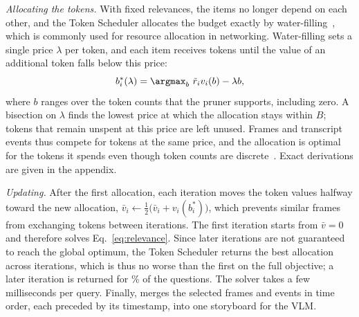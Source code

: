 \textit{Allocating the tokens.} With fixed relevances, the items no longer depend on each other, and the Token Scheduler allocates the budget exactly by water-filling~\cite{boyd2004}, which is commonly used for resource allocation in networking. Water-filling sets a single price $\lambda$ per token, and each item receives tokens until the value of an additional token falls below this price:
\begin{equation}
  b_i^*(\lambda)=\argmax_{b}\ \tilde r_iv_i(b)-\lambda b ,
  \label{eq:percost}
\end{equation}
where $b$ ranges over the token counts that the pruner supports, including zero. A bisection on $\lambda$ finds the lowest price at which the allocation stays within $B$; tokens that remain unspent at this price are left unused. Frames and transcript events thus compete for tokens at the same price, and the allocation is optimal for the tokens it spends even though token counts are discrete~\cite{everett1963}. Exact derivations are given in the appendix.

\textit{Updating.} After the first allocation, each iteration moves the token values halfway toward the new allocation, $\bar v_i\leftarrow\frac12\big(\bar v_i+v_i(b_i^*)\big)$, which prevents similar frames from exchanging tokens between iterations. The first iteration starts from $\bar v=0$ and therefore solves Eq.~\eqref{eq:relevance}. Since later iterations are not guaranteed to reach the global optimum, the Token Scheduler returns the best allocation across iterations, which is thus no worse than the first on the full objective; a later iteration is returned for \% of the questions. The solver takes a few milliseconds per query. Finally, \name merges the selected frames and events in time order, each preceded by its timestamp, into one storyboard for the VLM.

